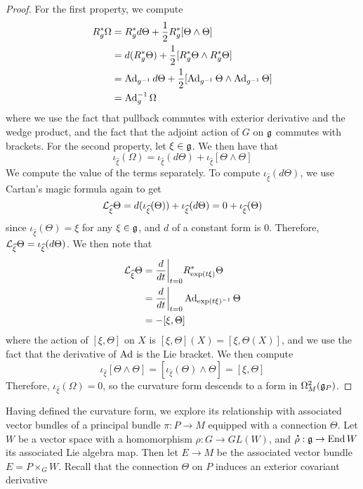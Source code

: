 \begin{proof}
For the first property, we compute
\begin{align*}
R_g^*\Omega &= R_g^*d\Theta + \frac{1}{2} R_g^*[\Theta \wedge \Theta] \\
&= d(R_g^*\Theta)+ \frac{1}{2}[R_g^*\Theta \wedge R_g^*\Theta]\\
&= \operatorname{Ad}_{g^{-1}}d\Theta + \frac{1}{2}[\operatorname{Ad}_{g^{-1}}\Theta \wedge \operatorname{Ad}_{g^{-1}}\Theta] \\
&= \operatorname{Ad}_g^{-1}\Omega
\end{align*}
where we use the fact that pullback commutes with exterior derivative and
the wedge product, and the fact that the adjoint action of $G$ on $\mathfrak{g}$ commutes with
brackets. For the second property, let $\xi \in \mathfrak{g}$. We then have that
\[
\iota_{\widehat{\xi}}(\Omega) = \iota_{\widehat{\xi}}(d\Theta)
+ \iota_{\widehat{\xi}}[\Theta \wedge \Theta]
\]
We compute the value of the terms separately. To compute $\iota_{\widehat{\xi}}(d\Theta)$,
we use Cartan's magic formula again to get
\[
\mathcal{L}_{\widehat{\xi}}\Theta = d(\iota_{\widehat{\xi}}(\Theta))
+ \iota_{\widehat{\xi}}(d\Theta) = 0 + \iota_{\widehat{\xi}}(\Theta)
\]
since $\iota_{\widehat{\xi}}(\Theta) = \xi$ for any $\xi \in \mathfrak{g}$, and $d$ of a
constant form is $0$. Therefore,
$\mathcal{L}_{\widehat{\xi}}\Theta = \iota_{\widehat{\xi}}(d\Theta)$. We then note that
\begin{align*}
\mathcal{L}_{\widehat{\xi}}\Theta &= \frac{d}{dt}\bigg\vert_{t = 0} R_{\exp(t\xi)}^*\Theta \\
&= \frac{d}{dt}\bigg\vert_{t=0} \operatorname{Ad}_{\exp(t\xi)^{-1}}\Theta \\
&= -[\xi, \Theta]
\end{align*}
where the action of $[\xi, \Theta]$ on $X$ is $[\xi, \Theta](X) = [\xi,\Theta(X)]$,
and we use the fact that the derivative of $\operatorname{Ad}$ is the Lie bracket. We then compute
\[
\iota_{\widehat{\xi}}[\Theta \wedge \Theta] =
[\iota_{\widehat{\xi}}(\Theta) \wedge \Theta] = [\xi, \Theta]
\]
Therefore, $\iota_{\widehat{\xi}}(\Omega) = 0$, so the curvature form descends to a
form in $\Omega_M^2(\mathfrak{g}_P)$.
\end{proof}
%
Having defined the curvature form, we explore its relationship with associated
vector bundles of a principal bundle $\pi : P \to M$ equipped with a connection $\Theta$.
Let $W$ be a vector space with a homomorphism $\rho : G \to GL(W)$, and
$\accentset{\mbox{\large\bfseries .}}{\rho} : \mathfrak{g} \to \operatorname{End} W$ its associated Lie algebra map. Then let $E \to M$ be
the associated vector bundle $E = P \times_G W$. Recall that the connection $\Theta$ on
$P$ induces an exterior covariant derivative
